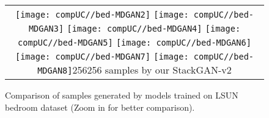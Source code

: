 \documentclass[10pt,journal,letterpaper,compsoc]{IEEEtran}
\begin{document}
\begin{figure*}[tb]
\begin{tabular}{c}
{        \texttt{[image: compUC//bed-MDGAN2]}
        \texttt{[image: compUC//bed-MDGAN3]}
        \texttt{[image: compUC//bed-MDGAN4]}
        \texttt{[image: compUC//bed-MDGAN5]}
        \texttt{[image: compUC//bed-MDGAN6]}
        \texttt{[image: compUC//bed-MDGAN7]}
        \texttt{[image: compUC//bed-MDGAN8]}}{256256 samples by our StackGAN-v2} \\ \end{tabular} 
    \vspace{-5pt}
    \caption{Comparison of samples generated by models trained on LSUN bedroom dataset (Zoom in for better comparison).}
\label{fig:compBed}
    \vspace{-10pt}
 \end{figure*}
\end{document}
